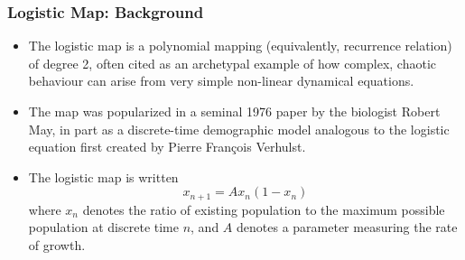 \documentclass[
	11pt, %
	aspectratio=169, %
]{beamer}
\begin{document}
\begin{frame}
	\frametitle{Logistic Map: Background}
    
        \begin{itemize}
            \item The logistic map is a polynomial mapping (equivalently, recurrence relation) of degree 2, often cited as an archetypal example of how complex, chaotic behaviour can arise from very simple non-linear dynamical equations. \pause
            \item The map was popularized in a seminal 1976 paper by the biologist Robert May, in part as a discrete-time demographic model analogous to the logistic equation first created by Pierre François Verhulst. \pause
            \item The logistic map is written
            \begin{equation}
                x_{n+1} = Ax_n(1-x_n)
            \end{equation}
            where $x_n$ denotes the ratio of existing population to the maximum possible population at discrete time $n$, and $A$ denotes a parameter measuring the rate of growth.
        \end{itemize}

\end{frame}

\end{document}
